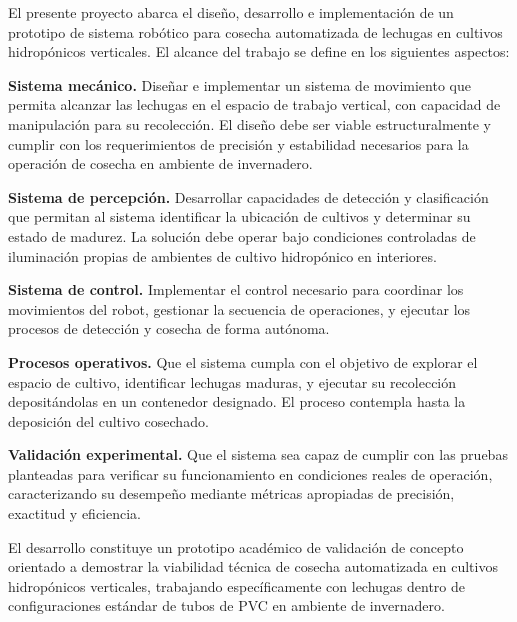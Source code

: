 El presente proyecto abarca el diseño, desarrollo e implementación de un prototipo de sistema robótico para cosecha automatizada de lechugas en cultivos hidropónicos verticales. El alcance del trabajo se define en los siguientes aspectos:

\textbf{Sistema mecánico.} Diseñar e implementar un sistema de movimiento que permita alcanzar las lechugas en el espacio de trabajo vertical, con capacidad de manipulación para su recolección. El diseño debe ser viable estructuralmente y cumplir con los requerimientos de precisión y estabilidad necesarios para la operación de cosecha en ambiente de invernadero.

\textbf{Sistema de percepción.} Desarrollar capacidades de detección y clasificación que permitan al sistema identificar la ubicación de cultivos y determinar su estado de madurez. La solución debe operar bajo condiciones controladas de iluminación propias de ambientes de cultivo hidropónico en interiores.

\textbf{Sistema de control.} Implementar el control necesario para coordinar los movimientos del robot, gestionar la secuencia de operaciones, y ejecutar los procesos de detección y cosecha de forma autónoma.

\textbf{Procesos operativos.} Que el sistema cumpla con el objetivo de explorar el espacio de cultivo, identificar lechugas maduras, y ejecutar su recolección depositándolas en un contenedor designado. El proceso contempla hasta la deposición del cultivo cosechado.

\textbf{Validación experimental.} Que el sistema sea capaz de cumplir con las pruebas planteadas para verificar su funcionamiento en condiciones reales de operación, caracterizando su desempeño mediante métricas apropiadas de precisión, exactitud y eficiencia.

El desarrollo constituye un prototipo académico de validación de concepto orientado a demostrar la viabilidad técnica de cosecha automatizada en cultivos hidropónicos verticales, trabajando específicamente con lechugas dentro de configuraciones estándar de tubos de PVC en ambiente de invernadero.
